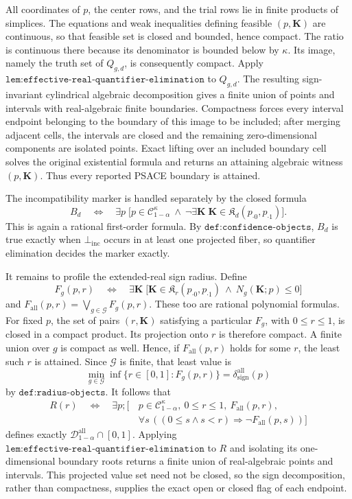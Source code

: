 All coordinates of \(p\), the center rows, and the trial rows lie in finite products of simplices.  The equations and weak inequalities defining feasible \((p,\mathbf K)\) are continuous, so that feasible set is closed and bounded, hence compact.  The ratio is continuous there because its denominator is bounded below by \(\kappa\).  Its image, namely the truth set of \(Q_{g,d}\), is consequently compact.  Apply \(\texttt{lem:effective-real-quantifier-elimination}\) to \(Q_{g,d}\).  The resulting sign-invariant cylindrical algebraic decomposition gives a finite union of points and intervals with real-algebraic finite boundaries.  Compactness forces every interval endpoint belonging to the boundary of this image to be included; after merging adjacent cells, the intervals are closed and the remaining zero-dimensional components are isolated points.  Exact lifting over an included boundary cell solves the original existential formula and returns an attaining algebraic witness \((p,\mathbf K)\).  Thus every reported PSACE boundary is attained.

The incompatibility marker is handled separately by the closed formula
\[
 B_d\quad\Longleftrightarrow\quad
 \exists p\;\bigl[p\in\mathcal C_{1-\alpha}^{\kappa}\ \wedge\ 
 \neg\exists\mathbf K\;\mathbf K\in
 \mathfrak K_d(p_{\cdot0},p_{\cdot1})\bigr].
\]
This is again a rational first-order formula.  By \(\texttt{def:confidence-objects}\), \(B_d\) is true exactly when \(\bot_{\mathrm{inc}}\) occurs in at least one projected fiber, so quantifier elimination decides the marker exactly.

It remains to profile the extended-real sign radius.  Define
\[
 F_g(p,r)\quad\Longleftrightarrow\quad
 \exists\mathbf K\;\bigl[
 \mathbf K\in\mathfrak K_r(p_{\cdot0},p_{\cdot1})\ \wedge\ 
 N_g(\mathbf K;p)\le0\bigr]
\]
and \(F_{\mathrm{all}}(p,r)=\bigvee_{g\in\mathcal G}F_g(p,r)\).  These too are rational polynomial formulas.  For fixed \(p\), the set of pairs \((r,\mathbf K)\) satisfying a particular \(F_g\), with \(0\le r\le1\), is closed in a compact product.  Its projection onto \(r\) is therefore compact.  A finite union over \(g\) is compact as well.  Hence, if \(F_{\mathrm{all}}(p,r)\) holds for some \(r\), the least such \(r\) is attained.  Since \(\mathcal G\) is finite, that least value is
\[
 \min_{g\in\mathcal G}\inf\{r\in[0,1]:F_g(p,r)\}
 =\delta_{\mathrm{sign}}^{\mathrm{all}}(p)
\]
by \(\texttt{def:radius-objects}\).  It follows that
\[
\begin{split}
 R(r)\quad\Longleftrightarrow\quad \exists p;[\,&p\in\mathcal C_{1-\alpha}^{\kappa},\ 
 0\le r\le1,\ F_{\mathrm{all}}(p,r),\\
 &\forall s\,((0\le s\wedge s<r)\Longrightarrow
 \neg F_{\mathrm{all}}(p,s))]
\end{split}
\]
defines exactly \(\mathcal D_{1-\alpha}^{\mathrm{all}}\cap[0,1]\).  Applying \(\texttt{lem:effective-real-quantifier-elimination}\) to \(R\) and isolating its one-dimensional boundary roots returns a finite union of real-algebraic points and intervals.  This projected value set need not be closed, so the sign decomposition, rather than compactness, supplies the exact open or closed flag of each endpoint.

